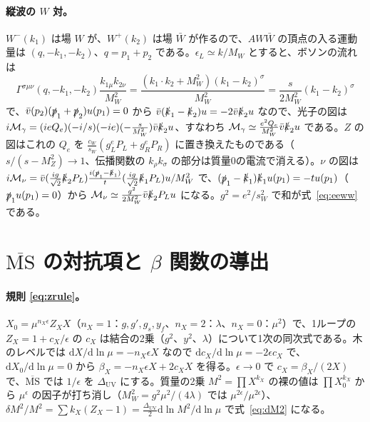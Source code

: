 \documentclass[a4paper,10pt]{ltjsarticle}
\newcommand{\dd}{\mathrm{d}}
\newcommand{\MSbar}{\overline{\mathrm{MS}}}
\newcommand{\DUV}{\Delta_{\mathrm{UV}}}
\newcommand{\sw}{s_W}
\newcommand{\cw}{c_W}
\begin{document}
\paragraph{縦波の $W$ 対。}$W^-(k_1)$ は場 $W$ が、$W^+(k_2)$ は場 $\bar W$ が作るので、$AW\bar W$ の頂点の入る運動量は $(q,-k_1,-k_2)$、$q=p_1+p_2$ である。$\epsilon_L\simeq k/M_W$ とすると、ボソンの流れは
\begin{equation*}
\Gamma^{\sigma\mu\nu}(q,-k_1,-k_2)\frac{k_{1\mu}k_{2\nu}}{M_W^2}=\frac{(k_1\!\cdot\!k_2+M_W^2)(k_1-k_2)^\sigma}{M_W^2}=\frac s{2M_W^2}(k_1-k_2)^\sigma
\end{equation*}
で、$\bar v(p_2)(\slashed p_1+\slashed p_2)u(p_1)=0$ から $\bar v(\slashed k_1-\slashed k_2)u=-2\bar v\slashed k_2u$ なので、光子の図は $i\mathcal M_\gamma=(ieQ_e)(-i/s)(-ie)(-\frac s{M_W^2})\bar v\slashed k_2u$、すなわち $\mathcal M_\gamma\simeq\frac{e^2Q_e}{M_W^2}\bar v\slashed k_2u$ である。$Z$ の図はこれの $Q_e$ を $\frac{\cw}{\sw}(g_L^eP_L+g_R^eP_R)$ に置き換えたものである（$s/(s-M_Z^2)\to1$、伝播関数の $k_\rho k_\sigma$ の部分は質量0の電流で消える）。$\nu$ の図は $i\mathcal M_\nu=\bar v(\frac{ig}{\sqrt2}\slashed k_2P_L)\frac{i(\slashed p_1-\slashed k_1)}{t}(\frac{ig}{\sqrt2}\slashed k_1P_L)u/M_W^2$ で、$(\slashed p_1-\slashed k_1)\slashed k_1u(p_1)=-tu(p_1)$（$\slashed p_1u(p_1)=0$）から $\mathcal M_\nu\simeq\frac{g^2}{2M_W^2}\bar v\slashed k_2P_Lu$ になる。$g^2=e^2/\sw^2$ で和が式~\eqref{eq:eeww} である。

\section{$\MSbar$ の対抗項と $\beta$ 関数の導出}\label{app:rg}

\paragraph{規則 \eqref{eq:zrule}。}$X_0=\mu^{n_X\epsilon}Z_XX$（$n_X=1$：$g,g',g_s,y_f$、$n_X=2$：$\lambda$、$n_X=0$：$\mu^2$）で、1ループの $Z_X=1+c_X/\epsilon$ の $c_X$ は結合の2乗（$g^2$、$y^2$、$\lambda$）について1次の同次式である。木のレベルでは $\dd X/\dd\ln\mu=-n_X\epsilon X$ なので $\dd c_X/\dd\ln\mu=-2\epsilon c_X$ で、$\dd X_0/\dd\ln\mu=0$ から $\beta_X=-n_X\epsilon X+2c_XX$ を得る。$\epsilon\to0$ で $c_X=\beta_X/(2X)$ で、$\MSbar$ では $1/\epsilon$ を $\DUV$ にする。質量の2乗 $M^2=\prod X^{k_X}$ の裸の値は $\prod X_0^{k_X}$ から $\mu^\epsilon$ の因子が打ち消し（$M_W^2=g^2\mu^2/(4\lambda)$ では $\mu^{2\epsilon}/\mu^{2\epsilon}$）、$\delta M^2/M^2=\sum k_X(Z_X-1)=\frac{\DUV}2\dd\ln M^2/\dd\ln\mu$ で式~\eqref{eq:dM2} になる。
\end{document}
